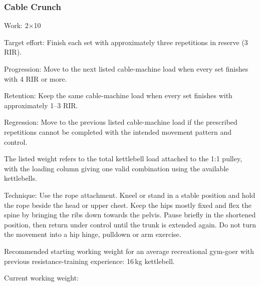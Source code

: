 \documentclass[11pt,a4paper]{article}
\begin{document}
\newpage
\subsubsection{Cable Crunch}

Work: 2$\times$10

Target effort: Finish each set with approximately three repetitions in reserve (3 RIR).

Progression: Move to the next listed cable-machine load when every set finishes with 4 RIR or more.

Retention: Keep the same cable-machine load when every set finishes with approximately 1--3 RIR.

Regression: Move to the previous listed cable-machine load if the prescribed repetitions cannot be completed with the intended movement pattern and control.

The listed weight refers to the total kettlebell load attached to the 1:1 pulley, with the loading column giving one valid combination using the available kettlebells.

Technique: Use the rope attachment. Kneel or stand in a stable position and hold the rope beside the head or upper chest. Keep the hips mostly fixed and flex the spine by bringing the ribs down towards the pelvis. Pause briefly in the shortened position, then return under control until the trunk is extended again. Do not turn the movement into a hip hinge, pulldown or arm exercise.

Recommended starting working weight for an average recreational gym-goer with previous resistance-training experience: 16\,kg kettlebell.

Current working weight:
\end{document}
